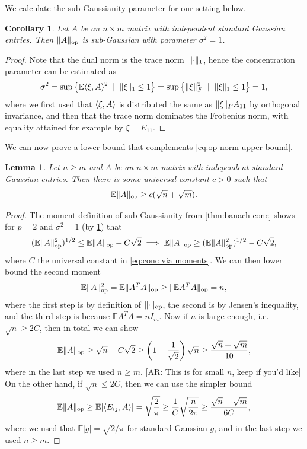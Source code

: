 \documentclass[aos]{imsart}
\newtheorem{corollary}[theorem]{Corollary}
\newtheorem{lemma}[theorem]{Lemma}
\theoremstyle{definition}
\numberwithin{equation}{section}
\DeclareMathOperator{\op}{op}
\DeclarePairedDelimiter{\norm}{\lVert}{\rVert}
\newcommand{\E}{\mathbb{E}}
\newcommand{\AR}[1]{{\color{orange}[AR: #1]}}
\begin{document}
\begin{appendix}
We calculate the sub-Gaussianity parameter for our setting below.

\begin{corollary}\label{l:opNormSubG}
Let $A$ be an $n \times m$ matrix with independent standard Gaussian entries.
Then $\norm{A}_{\op}$ is sub-Gaussian with parameter $\sigma^{2} = 1$.
\end{corollary}
\begin{proof}
Note that the dual norm is the trace norm~$\norm{\cdot}_1$, hence the concentration parameter can be estimated as
\begin{align*}
  \sigma^2
= \sup \left\{ \E \langle \xi, A \rangle^2 \;\mid\; \norm{\xi}_1 \leq 1 \right\}
= \sup \left\{ \norm\xi_F^2 \;\mid\; \norm{\xi}_1 \leq 1 \right\}
= 1,
\end{align*}
where we first used that $\braket{\xi,A}$ is distributed the same as $\norm\xi_F A_{11}$ by orthogonal invariance, and then that the trace norm dominates the Frobenius norm, with equality attained for example by $\xi = E_{11}$.
\end{proof}

We can now prove a lower bound that complements \cref{eq:op norm upper bound}.

\begin{lemma}\label{lem:op norm lower bound}
Let $n \geq m$ and $A$ be an $n \times m$ matrix with independent standard Gaussian entries. Then there is some universal constant $c > 0$ such that
\begin{equation*}
  \E \norm{A}_{\op} \geq c (\sqrt{n} + \sqrt{m}).
\end{equation*}
\end{lemma}
\begin{proof}
The moment definition of sub-Gaussianity from \cref{thm:banach conc} shows for $p=2$ and $\sigma^{2} = 1$ (by \cref{l:opNormSubG}) that
\[
  (\E \norm{A}_{\op}^{2})^{1/2} \leq \E \norm{A}_{\op} + C \sqrt{2}
\implies \E \norm{A}_{\op} \geq (\E \norm{A}_{\op}^{2})^{1/2} - C \sqrt{2},
\]
where $C$ the universal constant in \cref{eq:conc via moments}.
We can then lower bound the second moment
\[ \E \norm{A}_{\op}^{2} = \E \norm{A^{T} A}_{\op} \geq \norm{\E A^{T} A}_{\op} = n ,  \]
where the first step is by definition of $\norm{\cdot}_{\op}$, the second is by Jensen's inequality, and the third step is because $\E A^{T} A = n I_{m}$. Now if $n$ is large enough, i.e. $\sqrt{n} \geq 2 C$, then in total we can show
\[ \E \norm{A}_{\op} \geq \sqrt{n} - C\sqrt{2} \geq \left(1 - \frac{1}{\sqrt{2}} \right) \sqrt{n} \geq \frac{\sqrt{n} + \sqrt{m}}{10} , \]
where in the last step we used $n \geq m$. \AR{This is for small $n$, keep if you'd like} On the other hand, if $\sqrt{n} \leq 2 C$, then we can use the simpler bound
\[ \E \norm{A}_{\op} \geq \E |\langle E_{ij}, A \rangle| = \sqrt{\frac{2}{\pi}} \geq \frac{1}{C} \sqrt{ \frac{n}{2 \pi} } \geq \frac{\sqrt{n} + \sqrt{m}}{6 C} , \]
where we used that $\E |g| = \sqrt{2/\pi}$ for standard Gaussian $g$, and in the last step we used $n \geq m$. 


\end{proof}
\end{appendix}
\end{document}
